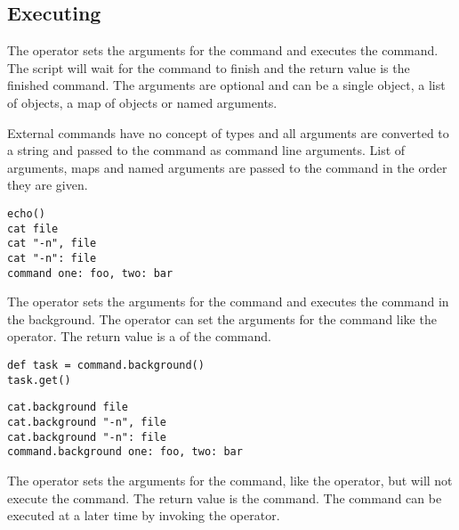 \subsection{Executing} 

%

The  operator sets the arguments for the command and executes 
the command. The script will wait for the command to finish and the return 
value 
is the finished command. The arguments are optional and can be a single object, 
a list of objects, a map of objects or named arguments. 

External commands have no concept of 
types and all arguments are converted
to a string and passed to the command as command line arguments.
List of arguments, maps and named arguments are passed to the command
in the order they are given.

\begin{lstlisting}[style=Groovybash, label={lst:example_call_op}, 
title={Execute command with no arguments or with specified arguments either 
direct or by key=value pairs.}]
echo()
cat file
cat "-n", file
cat "-n": file
command one: foo, two: bar
\end{lstlisting}

%

The  operator sets the arguments for the command and 
executes the
command in the background. 
The operator can set the arguments for the command like the 
operator. The return value is a \cite{future13} of the command.

\begin{lstlisting}[style=Groovybash, label={lst:example_background1}, 
title={Starts the command in the background and waits for the command to finish 
at some later time.}]
def task = command.background()
task.get()
\end{lstlisting}

\begin{lstlisting}[style=Groovybash, label={lst:example_background2}, 
title={Pass arguments to the command either direct or by key=value pairs.}]
cat.background file
cat.background "-n", file
cat.background "-n": file
command.background one: foo, two: bar
\end{lstlisting}


%

The  operator sets the arguments for the command, like 
the  operator, but will not execute the command. The return
value is the command. The command can be executed at a later time by invoking
the  operator.

